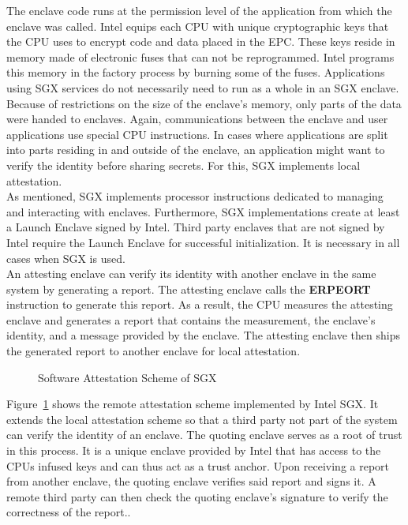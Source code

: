 The enclave code runs at the permission level of
the application from which the enclave was called. Intel equips each CPU with
unique cryptographic keys that the CPU uses to encrypt code and data placed in
the EPC. These keys reside in memory made of electronic fuses that can not be
reprogrammed. Intel programs this memory in the factory process by burning some
of the fuses. Applications using SGX services do not necessarily need to run as
a whole in an SGX enclave. Because of restrictions on the size of the enclave's
memory, only parts of the data were handed to enclaves. Again, communications
between the enclave and user applications use special CPU instructions. In cases
where applications are split into parts residing in and outside of the enclave,
an application might want to verify the identity before sharing secrets. For
this, SGX implements local attestation.\\

As mentioned, SGX implements processor instructions dedicated to managing and
interacting with enclaves. Furthermore, SGX implementations create at least a
Launch Enclave signed by Intel. Third party enclaves that are not signed by
Intel require the Launch Enclave for successful initialization. It is necessary
in all cases when SGX is used.\\

An attesting enclave can verify its identity with another enclave in the same
system by generating a report. The attesting enclave calls the \textbf{ERPEORT}
instruction to generate this report. As a result, the CPU measures the attesting
enclave and generates a report that contains the measurement, the enclave's
identity, and a message provided by the enclave. The attesting enclave then
ships the generated report to another enclave for local attestation.
\begin{center}
    \begin{figure}
        \centering
        
        \caption{Software Attestation Scheme of SGX}
        \label{fig:state:tee:sgx_attestation}
    \end{figure}
\end{center}
Figure~\ref{fig:state:tee:sgx_attestation} shows the remote attestation scheme
implemented by Intel SGX. It extends the local attestation scheme so that a
third party not part of the system can verify the identity of an enclave. The
quoting enclave serves as a root of trust in this process. It is a unique
enclave provided by Intel that has access to the CPUs infused keys and can thus
act as a trust anchor. Upon receiving a report from another enclave, the quoting
enclave verifies said report and signs it. A remote third party can then check
the quoting enclave's signature to verify the correctness of the report..

